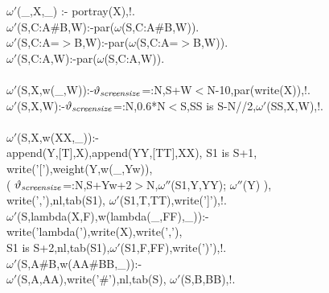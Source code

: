 \documentclass[11pt]{report}
\makeatletter
\newcommand{\ulinv}[1]{\index{#1@\texttt{#1}}}
\makeatother
\begin{document}
 \ulinv{wterm}
\begin{sf}\begin{tabbing}
$\omega'$(\_\hspace{0.1em},X,\_\hspace{0.1em}) :- portray(X),!.\\[-0.15ex]
$\omega'$(S,C:A\#B,W):-par($\omega$(S,C:A\#B,W)).\\[-0.15ex]
$\omega'$(S,C:A=$>$B,W):-par($\omega$(S,C:A=$>$B,W)).\\[-0.15ex]
$\omega'$(S,C:A,W):-par($\omega$(S,C:A,W)).\\[-0.7ex]
\\[-0.15ex]
$\omega'$(S,X,w(\_\hspace{0.1em},W)):-$\vartheta_{\it screensize}$=:N,S+W$<$N-10,par(write(X)),!.\\[-0.15ex]
$\omega'$(S,X,W):-$\vartheta_{\it screensize}$=:N,0.6*N$<$S,SS is S-N//2,$\omega'$(SS,X,W),!.\\[-0.7ex]
\\[-0.15ex]
$\omega'$(S,X,w(XX,\_\hspace{0.1em})):-\\[-0.15ex]
\hspace{2em}append(Y,[T],X),append(YY,[TT],XX), S1 is S+1,\\[-0.15ex]
\hspace{2em}write('['),weight(Y,w(\_\hspace{0.1em},Yw)),\\[-0.15ex]
\hspace{2em}( $\vartheta_{\it screensize}$=:N,S+Yw+2$>$N,$\omega''$(S1,Y,YY); $\omega''$(Y) ),\\[-0.15ex]
\hspace{2em}write(','),nl,tab(S1), $\omega'$(S1,T,TT),write(']'),!.\\[-0.15ex]
$\omega'$(S,lambda(X,F),w(lambda(\_\hspace{0.1em},FF),\_\hspace{0.1em})):-\\[-0.15ex]
\hspace{2em}write('lambda('),write(X),write(','),\\[-0.15ex]
\hspace{2em}S1 is S+2,nl,tab(S1),$\omega'$(S1,F,FF),write(')'),!.\\[-0.15ex]
$\omega'$(S,A\#B,w(AA\#BB,\_\hspace{0.1em})):-\\[-0.15ex]
\hspace{2em}$\omega'$(S,A,AA),write('\#'),nl,tab(S), $\omega'$(S,B,BB),!.\\[-0.15ex]

\end{tabbing}
\end{sf}
\end{document}
